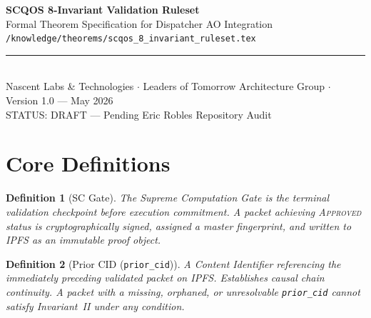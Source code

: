 \documentclass[11pt]{article}
\theoremstyle{invariantstyle}
\theoremstyle{defstyle}
\newtheorem{defn}{Definition}
\begin{document}
\begin{center}
  {\LARGE\bfseries\color{dispatcher} SCQOS 8-Invariant Validation Ruleset}\\[6pt]
  {\large Formal Theorem Specification for Dispatcher AO Integration}\\[4pt]
  \texttt{\small /knowledge/theorems/scqos\_8\_invariant\_ruleset.tex}\\[10pt]
  \rule{\textwidth}{0.6pt}\\[4pt]
  {\small
    Nascent Labs \& Technologies \quad $\cdot$ \quad
    Leaders of Tomorrow Architecture Group \quad $\cdot$ \quad
    Version 1.0 — May 2026
  }\\[2pt]
  {\small\textcolor{failred}{STATUS: DRAFT — Pending Eric Robles Repository Audit}}
\end{center}

\vspace{8pt}

\begin{center}
\end{center}

\section{Core Definitions}

\begin{defn}[SC Gate]
The Supreme Computation Gate is the terminal validation checkpoint before
execution commitment. A packet achieving \textsc{Approved} status is
cryptographically signed, assigned a master fingerprint, and written to IPFS
as an immutable proof object.
\end{defn}

\begin{defn}[Prior CID (\texttt{prior\_cid})]
A Content Identifier referencing the immediately preceding validated
packet on IPFS. Establishes causal chain continuity. A packet with a
missing, orphaned, or unresolvable \texttt{prior\_cid} cannot satisfy
Invariant~II under any condition.
\end{defn}
\end{document}
